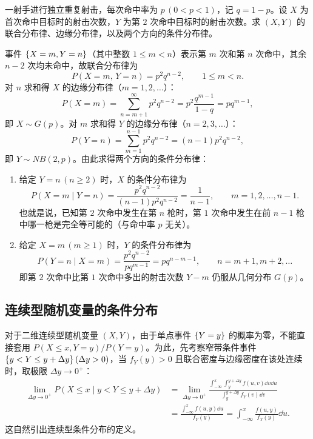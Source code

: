 \begin{example}[title={重复射击直到两次命中的条件分布}]
\label{eg:two-success-times}
一射手进行独立重复射击，每次命中率为 $p\,(0<p<1)$，记 $q=1-p$。设 $X$ 为首次命中目标时的射击次数，$Y$ 为第 $2$ 次命中目标时的射击次数。求 $(X,Y)$ 的联合分布律、边缘分布律，以及两个方向的条件分布律。
\begin{solution}
事件 $\{X=m,Y=n\}$（其中整数 $1\le m<n$）表示第 $m$ 次和第 $n$ 次命中，其余 $n-2$ 次均未命中，故联合分布律为
\[
  P(X=m,\,Y=n)=p^2 q^{n-2},\qquad 1\le m<n.
\]
对 $n$ 求和得 $X$ 的边缘分布律（$m=1,2,\ldots$）：
\[
  P(X=m)=\sum_{n=m+1}^{\infty}p^2 q^{n-2}=p^2\frac{q^{m-1}}{1-q}=pq^{m-1},
\]
即 $X\sim G(p)$。对 $m$ 求和得 $Y$ 的边缘分布律（$n=2,3,\ldots$）：
\[
  P(Y=n)=\sum_{m=1}^{n-1}p^2 q^{n-2}=(n-1)p^2 q^{n-2},
\]
即 $Y\sim NB(2,p)$。由此求得两个方向的条件分布律：
\begin{enumerate}
  \item 给定 $Y=n\,(n\ge 2)$ 时，$X$ 的条件分布律为
  \[
    P(X=m\mid Y=n)=\frac{p^2 q^{n-2}}{(n-1)p^2 q^{n-2}}=\frac{1}{n-1},\qquad m=1,2,\ldots,n-1.
  \]
  也就是说，已知第 $2$ 次命中发生在第 $n$ 枪时，第 $1$ 次命中发生在前 $n-1$ 枪中哪一枪是完全等可能的（与命中率 $p$ 无关）。
  \item 给定 $X=m\,(m\ge 1)$ 时，$Y$ 的条件分布律为
  \[
    P(Y=n\mid X=m)=\frac{p^2 q^{n-2}}{pq^{m-1}}=pq^{n-m-1},\qquad n=m+1,m+2,\ldots
  \]
  即第 $2$ 次命中比第 $1$ 次命中多出的射击次数 $Y-m$ 仍服从几何分布 $G(p)$。
\end{enumerate}
\end{solution}
\end{example}

\subsection{连续型随机变量的条件分布}

对于二维连续型随机变量 $(X,Y)$，由于单点事件 $\{Y=y\}$ 的概率为零，不能直接套用 $P(X\le x,Y=y)/P(Y=y)$。为此，先考察窄带条件事件 $\{y<Y\le y+\Delta y\}\,(\Delta y>0)$，当 $f_Y(y)>0$ 且联合密度与边缘密度在该处连续时，取极限 $\Delta y\to 0^+$：
\[
\begin{aligned}
  \lim_{\Delta y\to 0^+}P(X\le x\mid y<Y\le y+\Delta y)
  &=\lim_{\Delta y\to 0^+}\frac{\int_{-\infty}^{x}\int_{y}^{y+\Delta y}f(u,v)\dd v\dd u}{\int_{y}^{y+\Delta y}f_Y(v)\dd v}\\
  &=\frac{\int_{-\infty}^{x}f(u,y)\dd u}{f_Y(y)}
  =\int_{-\infty}^{x}\frac{f(u,y)}{f_Y(y)}\dd u.
\end{aligned}
\]
这自然引出连续型条件分布的定义。

